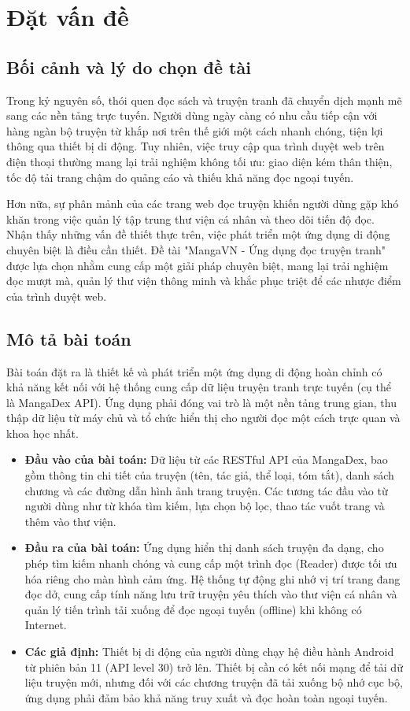 \chapter{Đặt vấn đề}

\section{Bối cảnh và lý do chọn đề tài}
Trong kỷ nguyên số, thói quen đọc sách và truyện tranh đã chuyển dịch mạnh mẽ sang các nền tảng trực tuyến. Người dùng ngày càng có nhu cầu tiếp cận với hàng ngàn bộ truyện từ khắp nơi trên thế giới một cách nhanh chóng, tiện lợi thông qua thiết bị di động. Tuy nhiên, việc truy cập qua trình duyệt web trên điện thoại thường mang lại trải nghiệm không tối ưu: giao diện kém thân thiện, tốc độ tải trang chậm do quảng cáo và thiếu khả năng đọc ngoại tuyến. 

Hơn nữa, sự phân mảnh của các trang web đọc truyện khiến người dùng gặp khó khăn trong việc quản lý tập trung thư viện cá nhân và theo dõi tiến độ đọc. Nhận thấy những vấn đề thiết thực trên, việc phát triển một ứng dụng di động chuyên biệt là điều cần thiết. Đề tài "MangaVN - Ứng dụng đọc truyện tranh" được lựa chọn nhằm cung cấp một giải pháp chuyên biệt, mang lại trải nghiệm đọc mượt mà, quản lý thư viện thông minh và khắc phục triệt để các nhược điểm của trình duyệt web.

\section{Mô tả bài toán}
Bài toán đặt ra là thiết kế và phát triển một ứng dụng di động hoàn chỉnh có khả năng kết nối với hệ thống cung cấp dữ liệu truyện tranh trực tuyến (cụ thể là MangaDex API). Ứng dụng phải đóng vai trò là một nền tảng trung gian, thu thập dữ liệu từ máy chủ và tổ chức hiển thị cho người đọc một cách trực quan và khoa học nhất.

\begin{itemize}
    \item \textbf{Đầu vào của bài toán:} Dữ liệu từ các RESTful API của MangaDex, bao gồm thông tin chi tiết của truyện (tên, tác giả, thể loại, tóm tắt), danh sách chương và các đường dẫn hình ảnh trang truyện. Các tương tác đầu vào từ người dùng như từ khóa tìm kiếm, lựa chọn bộ lọc, thao tác vuốt trang và thêm vào thư viện.
    \item \textbf{Đầu ra của bài toán:} Ứng dụng hiển thị danh sách truyện đa dạng, cho phép tìm kiếm nhanh chóng và cung cấp một trình đọc (Reader) được tối ưu hóa riêng cho màn hình cảm ứng. Hệ thống tự động ghi nhớ vị trí trang đang đọc dở, cung cấp tính năng lưu trữ truyện yêu thích vào thư viện cá nhân và quản lý tiến trình tải xuống để đọc ngoại tuyến (offline) khi không có Internet.
    \item \textbf{Các giả định:} Thiết bị di động của người dùng chạy hệ điều hành Android từ phiên bản 11 (API level 30) trở lên. Thiết bị cần có kết nối mạng để tải dữ liệu truyện mới, nhưng đối với các chương truyện đã tải xuống bộ nhớ cục bộ, ứng dụng phải đảm bảo khả năng truy xuất và đọc hoàn toàn ngoại tuyến.
\end{itemize}

